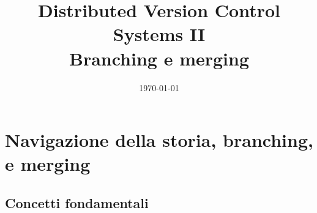 \documentclass[xcolor=dvipsnames,presentation]{beamer}
\title[{\lab} -- DVCS2]{Distributed Version Control Systems II \\
Branching e merging}
\date[\today]{\today}
\begin{document}
\frame[label=coverpage]{\titlepage}

\newcommand{\al}[0]{\textless}
\newcommand{\ar}[0]{\textgreater}
\newcommand{\gen}[1]{\al{}#1\ar{}}
\newcommand{\imgfr}[4]{\fr{#1}{#2
\begin{center}
\texttt{[image: \#4]}
\end{center}
}}

\section{Navigazione della storia, branching, e merging}

\subsection{Concetti fondamentali}
\end{document}
